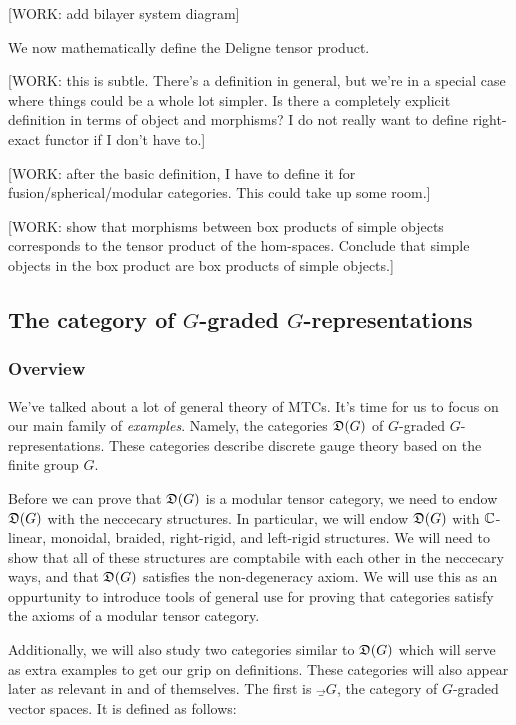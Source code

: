 [WORK: add bilayer system diagram]

We now mathematically define the Deligne tensor product.

[WORK: this is subtle. There's a definition in general, but we're in a special case where things could be a whole lot simpler. Is there a completely explicit definition in terms of object and morphisms? I do not really want to define right-exact functor if I don't have to.]


[WORK: after the basic definition, I have to define it for fusion/spherical/modular categories. This could take up some room.]

[WORK: show that morphisms between box products of simple objects corresponds to the tensor product of the hom-spaces. Conclude that simple objects in the box product are box products of simple objects.]

\subsection{The category of $G$-graded $G$-representations}

\subsubsection{Overview}

We've talked about a lot of general theory of MTCs. It's time for us to focus on our main family of \textit{examples}. Namely, the categories $\mathfrak{D}(G)$ of $G$-graded $G$-representations. These categories describe discrete gauge theory based on the finite group $G$.

Before we can prove that $\mathfrak{D}(G)$ is a modular tensor category, we need to endow $\mathfrak{D}(G)$ with the neccecary structures. In particular, we will endow $\mathfrak{D}(G)$ with $\mathbb{C}$-linear, monoidal, braided, right-rigid, and left-rigid structures. We will need to show that all of these structures are comptabile with each other in the neccecary ways, and that $\mathfrak{D}(G)$ satisfies the non-degeneracy axiom. We will use this as an oppurtunity to introduce tools of general use for proving that categories satisfy the axioms of a modular tensor category.

Additionally, we will also study two categories similar to $\mathfrak{D}(G)$ which will serve as extra examples to get our grip on definitions. These categories will also appear later as relevant in and of themselves. The first is $\Vec_G$, the category of $G$-graded vector spaces. It is defined as follows:

